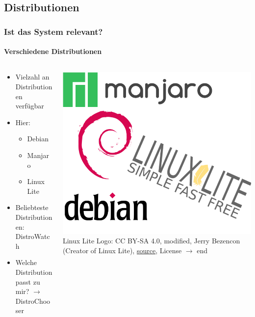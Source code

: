 \documentclass[9pt]{beamer}
\begin{document}
\subsection{Distributionen}
\begin{frame}
	\frametitle{Ist das System relevant?}
	\framesubtitle{Verschiedene Distributionen}
	\begin{columns}
    \begin{column}[c]{0.6\textwidth}

	\begin{itemize}
		\item Vielzahl an Distributionen verfügbar
		\item Hier:
			\begin{itemize}
				\item Debian
				\item Manjaro
				\item Linux Lite
			\end{itemize}
		\item Beliebteste Distributionen: DistroWatch
		\item Welche Distribution passt zu mir? $\rightarrow$ DistroChooser
	\end{itemize}
	\end{column}
		\begin{column}[c]{0.4\textwidth}
	 \includegraphics[width=1.0\textwidth]{assets/distro.png}
	 Linux Lite Logo: CC BY-SA 4.0, modified, Jerry Bezencon (Creator of Linux Lite), \href{https://commons.wikimedia.org/wiki/File:Linux_Lite_Simple_Fast_Free_logo.png}{source}, License $\rightarrow$ end
    \end{column}
	\end{columns}
\end{frame}
\end{document}
